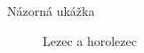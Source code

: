 \documentclass[pdf,fyma2, total]{prosper}
\begin{document}
\begin{slide}{Názorná ukážka}
	\bigskip
	\begin{figure}[h]
		\begin{center}
			\caption{Lezec a horolezec}
		\end{center}
	\end{figure}

\end{slide}
\end{document}

